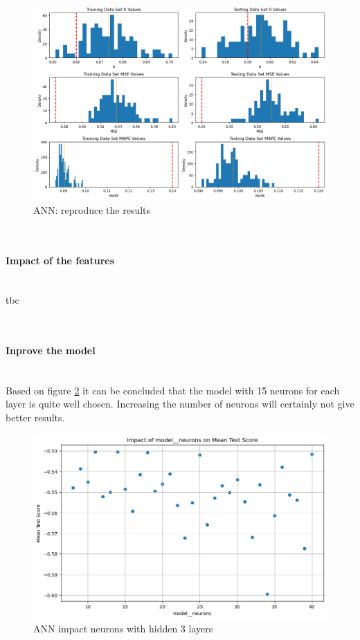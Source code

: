 \documentclass{article}
\newcommand{\subsubsubsection}[1]{%
  \paragraph{#1}\mbox{}\\}
\begin{document}
\begin{figure}
	\centering
	\includegraphics[width=\linewidth]{figures/ANN_reproduce_the_results.png}
	\caption{ANN: reproduce the results}
	\label{fig:ANN-reproduce-the-results}
\end{figure}


\subsubsubsection{Impact of the features}
tbc

\subsubsubsection{Inprove the model}
Based on figure \ref{fig:ANN-impact-neurons-3layers} it can be concluded that the model with 15 neurons for each layer is quite well chosen. Increasing the number of neurons will certainly not give better results.

\begin{figure}
	\centering
	\includegraphics[width=\linewidth]{figures/ANN_impact_neurons_3layers.png}
	\caption{ANN impact neurons with hidden 3 layers}
	\label{fig:ANN-impact-neurons-3layers}
\end{figure}
\end{document}
